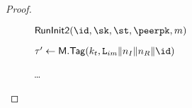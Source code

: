 \begin{proof}
\begin{collectinmacro}{\SIGMIProofSignatureMAC}{}{}
\begin{figure}[tp]
\begin{minipage}[t]{0.49\textwidth}
\begin{oracle}{$\RunInit(\id,\sk,\st,\peerpk,m)$}
			\item \hindent $\tau' \gets \MACScheme.\MACTag(\kt, \labelim\|\nonce_I\|\nonce_R\|\id)$
			\item \hindent {}
			\item \hindent \hindent {}
			\item \dots
		\end{oracle}

		\ExptSepSpace


\end{minipage}
\end{figure}
\end{collectinmacro}
\end{proof}
